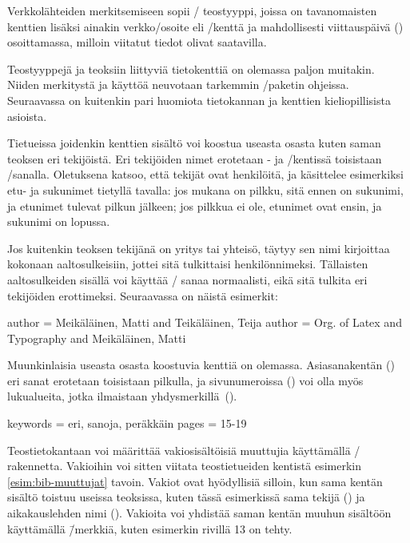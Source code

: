 Verkkolähteiden merkitsemiseen sopii \-/ teostyyppi,
joissa on tavanomaisten kenttien lisäksi ainakin verkko\-/osoite eli
\-/kenttä ja mahdollisesti viittauspäivä ()
osoittamassa, milloin viitatut tiedot olivat saatavilla.

Teostyyppejä ja teoksiin liittyviä tietokenttiä on olemassa paljon
muitakin. Niiden merkitystä ja käyttöä neuvotaan tarkemmin
\-/paketin ohjeissa. Seuraavassa on kuitenkin pari
huomiota tietokannan ja kenttien kieliopillisista asioista.

Tietueissa joidenkin kenttien sisältö voi koostua useasta osasta kuten
saman teoksen eri tekijöistä. Eri tekijöiden nimet erotetaan
- ja \-/kentissä toisistaan
\-/sanalla. Oletuksena  katsoo, että
tekijät ovat henkilöitä, ja käsittelee esimerkiksi etu- ja sukunimet
tietyllä tavalla: jos mukana on pilkku, sitä ennen on sukunimi, ja
etunimet tulevat pilkun jälkeen; jos pilkkua ei ole, etunimet ovat
ensin, ja sukunimi on lopussa.

Jos kuitenkin teoksen tekijänä on yritys tai yhteisö, täytyy sen nimi
kirjoittaa kokonaan aaltosulkeisiin, jottei sitä tulkittaisi
henkilönnimeksi. Tällaisten aaltosulkeiden sisällä voi käyttää
\-/ sanaa normaalisti, eikä sitä tulkita eri tekijöiden
erottimeksi. Seuraavassa on näistä esimerkit:

\begin{koodilohkosis}
  author = {Meikäläinen, Matti and Teikäläinen, Teija}
  author = {{Org. of Latex and Typography} and Meikäläinen, Matti}
\end{koodilohkosis}

Muunkinlaisia useasta osasta koostuvia kenttiä on olemassa.
Asiasanakentän () eri sanat erotetaan toisistaan
pilkulla, ja sivunumeroissa () voi olla myös lukualueita,
jotka ilmaistaan yhdysmerkillä~\mbox{(\koodi{-})}.

\begin{koodilohkosis}
  keywords = {eri, sanoja, peräkkäin}
  pages = {15-19}
\end{koodilohkosis}

Teostietokantaan voi määrittää vakiosisältöisiä muuttujia käyttämällä
\-/ rakennetta. Vakioihin voi sitten viitata
teostietueiden kentistä esimerkin \ref{esim:bib-muuttujat} tavoin.
Vakiot ovat hyödyllisiä silloin, kun sama kentän sisältö toistuu useissa
teoksissa, kuten tässä esimerkissä sama tekijä () ja
aikakauslehden nimi (). Vakioita voi yhdistää
saman kentän muuhun sisältöön käyttämällä \koodi{\#}\=/merkkiä, kuten
esimerkin rivillä 13 on tehty.

